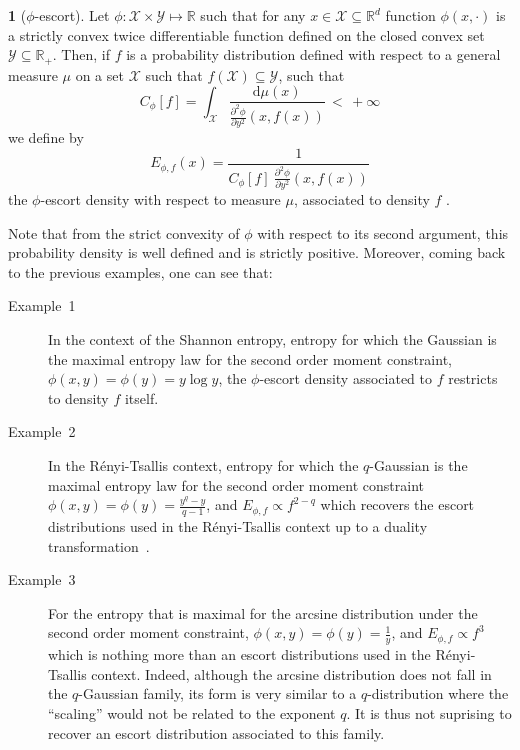 \documentclass[english,sort&compress]{elsarticle}
\theoremstyle{definition}
\newtheorem{defn}{\protect\definitionname}
\theoremstyle{plain}
\theoremstyle{plain}
\providecommand{\definitionname}{Definition}
\def\dmu{\mathrm{d}\mu}
\def\Rset{\mathbb{R}}
\def\X{\mathcal{X}}
\def\Y{\mathcal{Y}}
\begin{document}
\begin{defn}[$\phi$-escort]\label{def:phi-escort}
  Let $\phi: \X \times  \Y \mapsto \Rset$ such that for any  $x \in \X \subseteq
  \Rset^d$ function  $\phi(x,\cdot)$ is  a strictly convex  twice differentiable
  function defined  on the closed convex  set $\Y \subseteq \Rset_+$.   Then, if
  $f$ is  a probability distribution defined  with respect to a  general measure
  $\mu$ on a set $\X$ such that $f(\X) \subseteq \Y$, such that
  \begin{equation}
\label{eq:Cphi}
  C_\phi[f]    =     \int_\X    \frac{\dmu(x)}{\frac{\partial^2    \phi}{\partial
      y^2}(x,f(x))} \, < \, + \infty
  \end{equation}
  we define by
  \begin{equation}\label{eq:phi-escort}
    E_{\phi,f}(x) = \frac{1}{\displaystyle C_\phi[f] \: \frac{\partial^2
    \phi}{\partial y^2}(x,f(x))}
  \end{equation}
  the $\phi$-escort density with respect to measure $\mu$, associated to density
  $f$ .
\end{defn}
%
Note  that from  the  strict convexity  of  $\phi$ with  respect  to its  second
argument,   this  probability   density  is   well  defined   and   is  strictly
positive. Moreover, coming back to the previous examples, one can see that:
%
\begin{description}%
\item[Example~1] In  the context of the  Shannon entropy, entropy  for which the
  Gaussian is  the maximal entropy law  for the second  order moment constraint,
  $\phi(x,y) = \phi(y) = y \log  y$, the $\phi$-escort density associated to $f$
  restricts to density $f$ itself.
%
\item[Example~2]  In   the  R\'enyi-Tsallis  context,  entropy   for  which  the
  $q$-Gaussian is the maximal entropy law for the second order moment constraint
  $\phi(x,y) =  \phi(y) =  \frac{y^q-y}{q-1}$, and $E_{\phi,f}  \propto f^{2-q}$
  which recovers the escort distributions used in the R\'enyi-Tsallis context up
  to a duality transformation~\cite{Nau11}.
\item[Example~3] For  the entropy that  is maximal for the  arcsine distribution
  under the second order moment constraint, $\phi(x,y) = \phi(y) = \frac{1}{y}$,
  and  $E_{\phi,f}   \propto  f^3$  which   is  nothing  more  than   an  escort
  distributions  used  in  the  R\'enyi-Tsallis context.  Indeed,  although  the
  arcsine distribution  does not fall  in the  $q$-Gaussian family, its  form is
  very similar to a $q$-distribution where  the ``scaling'' would not be related
  to  the  exponent  $q$.   It  is  thus not  suprising  to  recover  an  escort
  distribution associated to this family.
\end{description}
\end{document}
